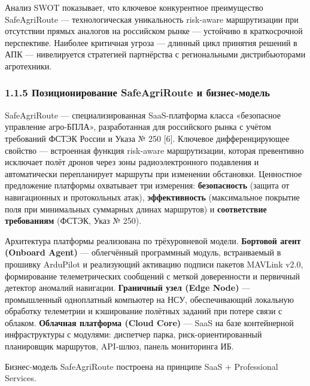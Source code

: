 Анализ SWOT показывает, что ключевое конкурентное преимущество SafeAgriRoute --- технологическая уникальность risk-aware маршрутизации при отсутствии прямых аналогов на российском рынке --- устойчиво в краткосрочной перспективе. Наиболее критичная угроза --- длинный цикл принятия решений в АПК --- нивелируется стратегией партнёрства с региональными дистрибьюторами агротехники.

\hypertarget{ux43fux43eux437ux438ux446ux438ux43eux43dux438ux440ux43eux432ux430ux43dux438ux435-safeagriroute-ux438-ux431ux438ux437ux43dux435ux441-ux43cux43eux434ux435ux43bux44c}{%
\subsubsection{1.1.5 Позиционирование SafeAgriRoute и бизнес-модель}\label{ux43fux43eux437ux438ux446ux438ux43eux43dux438ux440ux43eux432ux430ux43dux438ux435-safeagriroute-ux438-ux431ux438ux437ux43dux435ux441-ux43cux43eux434ux435ux43bux44c}}

SafeAgriRoute --- специализированная SaaS-платформа класса «безопасное управление агро-БПЛА», разработанная для российского рынка с учётом требований ФСТЭК России и Указа № 250 {[}6{]}. Ключевое дифференцирующее свойство --- встроенная функция risk-aware маршрутизации, которая превентивно исключает полёт дронов через зоны радиоэлектронного подавления и автоматически перепланирует маршруты при изменении обстановки. Ценностное предложение платформы охватывает три измерения: \textbf{безопасность} (защита от навигационных и протокольных атак), \textbf{эффективность} (максимальное покрытие поля при минимальных суммарных длинах маршрутов) и \textbf{соответствие требованиям} (ФСТЭК, Указ № 250).

Архитектура платформы реализована по трёхуровневой модели. \textbf{Бортовой агент (Onboard Agent)} --- облегчённый программный модуль, встраиваемый в прошивку ArduPilot и реализующий активацию подписи пакетов MAVLink v2.0, формирование телеметрических сообщений с меткой доверенности и первичный детектор аномалий навигации. \textbf{Граничный узел (Edge Node)} --- промышленный одноплатный компьютер на НСУ, обеспечивающий локальную обработку телеметрии и кэширование полётных заданий при потере связи с облаком. \textbf{Облачная платформа (Cloud Core)} --- SaaS на базе контейнерной инфраструктуры с модулями: диспетчер парка, риск-ориентированный планировщик маршрутов, API-шлюз, панель мониторинга ИБ.

Бизнес-модель SafeAgriRoute построена на принципе SaaS + Professional Services.

